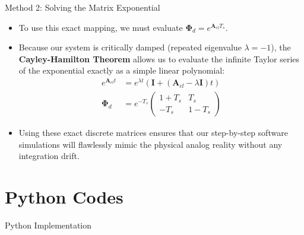 \documentclass{beamer}
\theoremstyle{remark}
\newcommand{\myvec}[1]{\ensuremath{\begin{pmatrix}#1\end{pmatrix}}}
\let\vec\mathbf
\numberwithin{equation}{section}
\begin{document}
\begin{frame}{Method 2: Solving the Matrix Exponential}
    \begin{itemize}
        \item To use this exact mapping, we must evaluate $\vec{\Phi}_d = e^{\vec{A}_{cl}T_s}$. 
        \item Because our system is critically damped (repeated eigenvalue $\lambda=-1$), the \textbf{Cayley-Hamilton Theorem} allows us to evaluate the infinite Taylor series of the exponential exactly as a simple linear polynomial:
        \begin{align}
            e^{\vec{A}_{cl}t} &= e^{\lambda t} \left( \vec{I} + (\vec{A}_{cl} - \lambda\vec{I})t \right) \\
            \vec{\Phi}_d &= e^{-T_s} \myvec{ 1+T_s & T_s \\ -T_s & 1-T_s }
        \end{align}
        \item Using these exact discrete matrices ensures that our step-by-step software simulations will flawlessly mimic the physical analog reality without any integration drift.
    \end{itemize}
\end{frame}

\section{Python Codes}
\begin{frame}{Python Implementation}
    
\end{frame}
\end{document}
